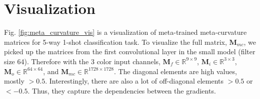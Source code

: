 \documentclass{article}
\newcommand*{\B}[1]{\mathbf{#1}}
\begin{document}
\section{Visualization}
Fig. \ref{fig:meta_curvature_vis} is a visualization of meta-trained meta-curvature matrices for 5-way 1-shot classification task. To visualize the full matrix, $\B{M}_{mc}$, we picked up the matrices from the first convolutional layer in the small model (filter size 64). Therefore with the 3 color input channels, $\B{M}_f \in \mathbb{R}^{9 \times 9}$, $\B{M}_i  \in \mathbb{R}^{3 \times 3}$, $\B{M}_o  \in \mathbb{R}^{64 \times 64}$, and $\B{M}_{mc}  \in \mathbb{R}^{1728 \times 1728}$. The diagonal elements are high values, mostly $> 0.5$. Interestingly, there are also a lot of off-diagonal elements $> 0.5$ or $< -0.5$. Thus, they capture the dependencies between the gradients.
\end{document}
